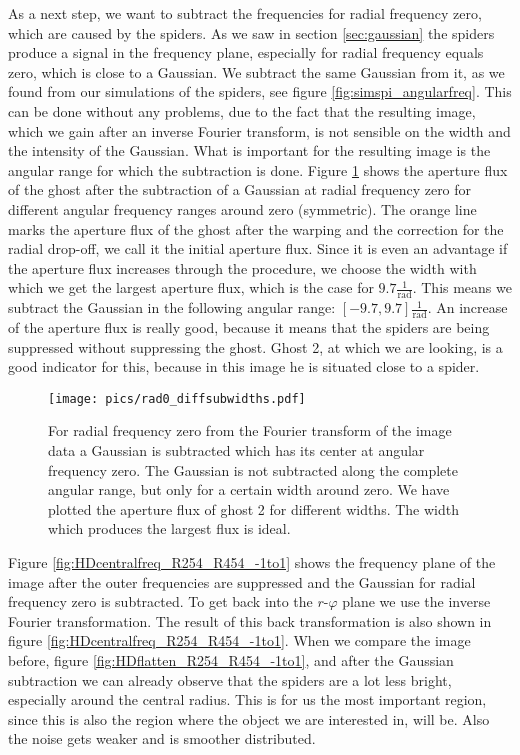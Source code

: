As a next step, we want to subtract the frequencies for radial frequency zero, which are caused by the spiders. As we saw in section \ref{sec:gaussian} the spiders produce a signal in the frequency plane, especially for radial frequency equals zero, which is close to a Gaussian. We subtract the same Gaussian from it, as we found from our simulations of the spiders, see figure \ref{fig:simspi_angularfreq}. This can be done without any problems, due to the fact that the resulting image, which we gain after an inverse Fourier transform, is not sensible on the width and the intensity of the Gaussian. What is important for the resulting image is the angular range for which the subtraction is done. Figure \ref{fig:rad0_diffsubwidths} shows the aperture flux of the ghost after the subtraction of a Gaussian at radial frequency zero for different angular frequency ranges around zero (symmetric). The orange line marks the aperture flux of the ghost after the warping and the correction for the radial drop-off, we call it the initial aperture flux. Since it is even an advantage if the aperture flux increases through the procedure, we choose the width with which we get the largest aperture flux, which is the case for $9.7 \frac{1}{\mathrm{rad}}$. This means we subtract the Gaussian in the following angular range: $[-9.7, 9.7] \frac{1}{\mathrm{rad}}$. An increase of the aperture flux is really good, because it means that the spiders are being suppressed without suppressing the ghost. Ghost 2, at which we are looking, is a good indicator for this, because in this image he is situated close to a spider.
\begin{figure}[H]
	\centering
		\texttt{[image: pics/rad0\_diffsubwidths.pdf]}
		\caption{For radial frequency zero from the Fourier transform of the image data a Gaussian is subtracted which has its center at angular frequency zero. The Gaussian is not subtracted along the complete angular range, but only for a certain width around zero. We have plotted the aperture flux of ghost 2 for different widths. The width which produces the largest flux is ideal.}
		\label{fig:rad0_diffsubwidths}
\end{figure}
Figure \ref{fig:HDcentralfreq_R254_R454_-1to1} shows the frequency plane of the image after the outer frequencies are suppressed and the Gaussian for radial frequency zero is subtracted. To get back into the $r$-$\varphi$ plane we use the inverse Fourier transformation. The result of this back transformation is also shown in figure \ref{fig:HDcentralfreq_R254_R454_-1to1}. When we compare the image before, figure \ref{fig:HDflatten_R254_R454_-1to1}, and after the Gaussian subtraction we can already observe that the spiders are a lot less bright, especially around the central radius. This is for us the most important region, since this is also the region where the object we are interested in, will be. Also the noise gets weaker and is smoother distributed. \\
